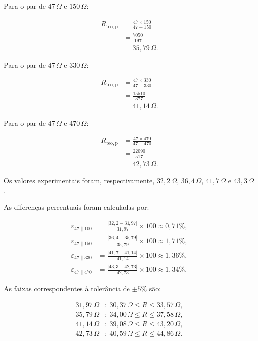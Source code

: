 \documentclass[a4paper,12pt]{article}
\begin{document}
Para o par de $47\,\Omega$ e $150\,\Omega$:

\[
\begin{aligned}
R_{\mathrm{teo,p}}
  &=
  \frac{47\times150}{47+150}\\
  &=
  \frac{7050}{197}\\
  &=35{,}79\,\Omega.
\end{aligned}
\]

Para o par de $47\,\Omega$ e $330\,\Omega$:

\[
\begin{aligned}
R_{\mathrm{teo,p}}
  &=
  \frac{47\times330}{47+330}\\
  &=
  \frac{15510}{377}\\
  &=41{,}14\,\Omega.
\end{aligned}
\]

Para o par de $47\,\Omega$ e $470\,\Omega$:

\[
\begin{aligned}
R_{\mathrm{teo,p}}
  &=
  \frac{47\times470}{47+470}\\
  &=
  \frac{22090}{517}\\
  &=42{,}73\,\Omega.
\end{aligned}
\]

Os valores experimentais foram, respectivamente,
$32{,}2\,\Omega$, $36{,}4\,\Omega$, $41{,}7\,\Omega$ e
$43{,}3\,\Omega$.

As diferenças percentuais foram calculadas por:

\[
\begin{aligned}
\varepsilon_{47\parallel100}
  &=
  \frac{|32{,}2-31{,}97|}{31{,}97}\times100
  \approx0{,}71\%,\\[0.2cm]
\varepsilon_{47\parallel150}
  &=
  \frac{|36{,}4-35{,}79|}{35{,}79}\times100
  \approx1{,}71\%,\\[0.2cm]
\varepsilon_{47\parallel330}
  &=
  \frac{|41{,}7-41{,}14|}{41{,}14}\times100
  \approx1{,}36\%,\\[0.2cm]
\varepsilon_{47\parallel470}
  &=
  \frac{|43{,}3-42{,}73|}{42{,}73}\times100
  \approx1{,}34\%.
\end{aligned}
\]

As faixas correspondentes à tolerância de $\pm5\%$ são:

\[
\begin{aligned}
31{,}97\,\Omega &:\
30{,}37\,\Omega
\leq R \leq
33{,}57\,\Omega,\\
35{,}79\,\Omega &:\
34{,}00\,\Omega
\leq R \leq
37{,}58\,\Omega,\\
41{,}14\,\Omega &:\
39{,}08\,\Omega
\leq R \leq
43{,}20\,\Omega,\\
42{,}73\,\Omega &:\
40{,}59\,\Omega
\leq R \leq
44{,}86\,\Omega.
\end{aligned}
\]
\end{document}
